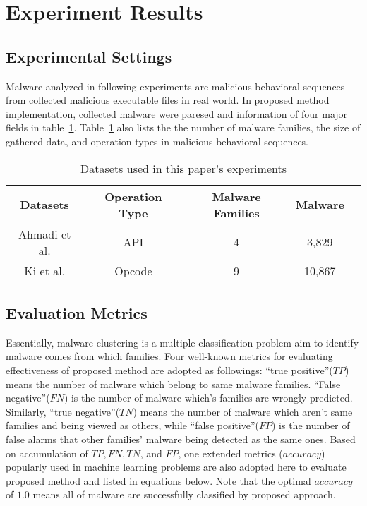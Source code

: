 \section{Experiment Results}

{\color{red}{Tony, pliz write overview here!!!}}

\subsection{Experimental Settings}

{\color{red}{Tony, pliz write like the followings in this subsection!}}

Malware analyzed in following experiments are malicious behavioral sequences from collected malicious executable files in real world.  In proposed method implementation, collected malware were paresed and information of four major fields in table~\ref{tbl:db_01}. Table~\ref{tbl:db_01} also lists the the number of malware families, the size of gathered data, and operation types in malicious behavioral sequences. 

\begin{table}[]
\centering
\caption{Datasets used in this paper's experiments}
\label{tbl:db_01}
\begin{tabular}{lllll}
\\\hline\hline
 \multicolumn{1}{c|}{Datasets} & \multicolumn{1}{c|}{Operation Type}   & \multicolumn{1}{c|}{Malware Families} &   \multicolumn{1}{c|}{Malware}    \\\hline
\multicolumn{1}{c|}{Ahmadi et al. \cite{ahmadi2016novel}} & \multicolumn{1}{c|}{API}              & \multicolumn{1}{c|}{4}  &  \multicolumn{1}{c|}{3,829}                  \\\hline
\multicolumn{1}{c|}{Ki et al. \cite{ki2015novel}} & \multicolumn{1}{c|}{Opcode}            & \multicolumn{1}{c|}{9}  &  \multicolumn{1}{c|}{10,867}                 \\\hline\hline
\end{tabular}
\end{table}

\subsection{Evaluation Metrics}

Essentially, malware clustering is a multiple classification problem aim to identify malware comes from which families. Four well-known metrics for evaluating effectiveness of proposed method are adopted as followings: ``true positive''($TP$) means the number of malware which belong to same malware families. ``False negative''($FN$) is the number of malware which's families are wrongly predicted. Similarly, ``true negative''($TN$) means the number of malware which aren't same families and being viewed as others, while ``false positive''($FP$) is the number of false alarms that other families' malware being detected as the same ones. Based on accumulation of $TP, FN, TN$, and $FP$, one extended metrics ($accuracy$) popularly used in machine learning problems are also adopted here to evaluate proposed method and listed in equations below. Note that the optimal $accuracy$ of $1.0$ means all of malware are successfully classified by proposed approach. 

